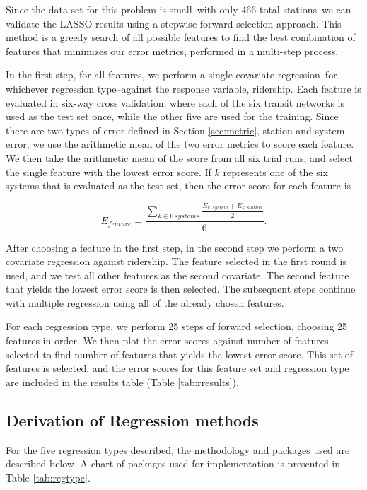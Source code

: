 \documentclass[11pt]{article}
\begin{document}
Since the data set for this problem is small--with only 466 total stations--we can validate the LASSO results using a stepwise forward selection approach. This method is a greedy search of all possible features to find the best combination of features that minimizes our error metrics, performed in a multi-step process.

In the first step, for all features, we perform a single-covariate regression--for whichever regression type--against the response variable, ridership. Each feature is evaluated in six-way cross validation, where each of the six transit networks is used as the test set once, while the other five are used for the training. Since there are two types of error defined in Section \ref{sec:metric}, station and system error, we use the arithmetic mean of the two error metrics to score each feature. We then take the arithmetic mean of the score from all six trial runs, and select the single feature with the lowest error score. If $k$ represents one of the six systems that is evaluated as the test set, then the error score for each feature is

$$ E_{feature} = \displaystyle\frac{\sum\limits_{k\in 6\,systems}\displaystyle\frac{E_{k, system} + E_{k, station}}{2}}{6}.$$

After choosing a feature in the first step, in the second step we perform a two covariate regression against ridership. The feature selected in the first round is used, and we test all other features as the second covariate. The second feature that yields the lowest error score is then selected. The subsequent steps continue with multiple regression using all of the already chosen features. 

For each regression type, we perform 25 steps of forward selection, choosing 25 features in order. We then plot the error scores against number of features selected to find number of features that yields the lowest error score. This set of features is selected, and the error scores for this feature set and regression type are included in the results table (Table \ref{tab:rresults}).


\subsection{Derivation of Regression methods}
For the five regression types described, the methodology and packages used are described below. A chart of packages used for implementation is presented in Table \ref{tab:regtype}.
\end{document}
